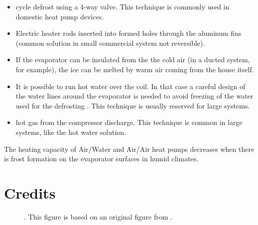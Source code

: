 \begin{itemize}
\item cycle defrost using a 4-way valve. This technique is commonly
  used in domestic heat pump devices.
\item Electric heater rods inserted into formed holes through the
  aluminum fins (common solution in small commercial system not
  reversible).
\item If the evaporator can be insulated from the the cold air (in a
  ducted system, for example), the ice can be melted by warm air
  coming from the house itself.
\item It is possible to run hot water over the coil. In that case a
  careful design of the water lines around the evaporator is needed to
  avoid freezing of the water used for the defrosting
  \citep[p.\,169]{dincer-kanoglu-2010a}. This technique is usually
  reserved for large systems.
\item hot gas from the compressor discharge. This technique is common
  in large systems, like the hot water solution.
\end{itemize}

The heating capacity of Air/Water and Air/Air heat pumps decreases when
there is frost formation on the evaporator surfaces in humid climates.


\FloatBarrier


\label{sec:art-refs}

\section*{Credits}
\label{sec:art-credits}

\begin{description}
\item[] . This figure is based on an
  original figure from \citet[Fig. 1, p. 565]{zwyssig-round-2009a}.
\end{description}
